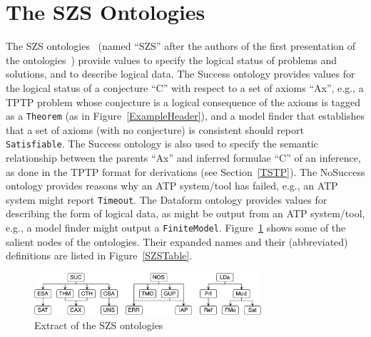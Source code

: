 \documentclass{easychair}
\begin{document}
\section{The SZS Ontologies}
\label{SZS}

The SZS ontologies~\cite{Sut08-KEAPPA} (named ``SZS'' after the authors of the first presentation 
of the ontologies~\cite{SZS03}) provide values to specify the logical status of problems and
solutions, and to describe logical data.
The Success ontology provides values for the logical status of a conjecture ``C'' with respect to a 
set of axioms ``Ax'', e.g., a TPTP problem whose conjecture is a logical consequence of the axioms 
is tagged as a {\tt Theorem} (as in Figure~\ref{ExampleHeader}), and a model finder that 
establishes that a set of axioms (with no conjecture) is consistent should report 
{\tt Satisfiable}.
The Success ontology is also used to specify the semantic relationship between the parents ``Ax''
and inferred formulae ``C'' of an inference, as done in the TPTP format for derivations (see 
Section~\ref{TSTP}).
The NoSuccess ontology provides reasons why an ATP system/tool has failed, e.g., an ATP system 
might report {\tt Timeout}.
The Dataform ontology provides values for describing the form of logical data, as might be output 
from an ATP system/tool, e.g., a model finder might output a {\tt FiniteModel}.
Figure~\ref{SZSExtract} shows some of the salient nodes of the ontologies.
Their expanded names and their (abbreviated) definitions are listed in Figure~\ref{SZSTable}.

\begin{figure}[htb]
\centering
\includegraphics[width=0.75\textwidth]{SZSExtract.pdf}
\caption{Extract of the SZS ontologies}
\label{SZSExtract}
\end{figure} 
\end{document}
